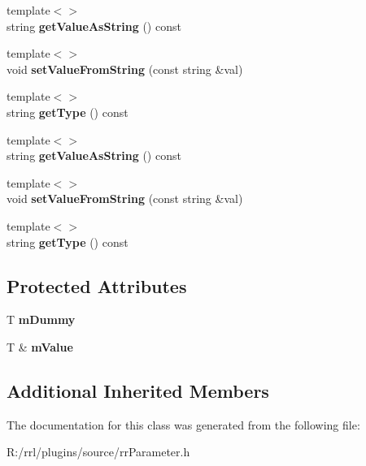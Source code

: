 \begin{DoxyCompactItemize}
\item 
\hypertarget{classrrp_1_1_parameter_a2f3b3ce7dbe0f955aa7c177637f9fbb0}{{\footnotesize template$<$$>$ }\\string {\bfseries get\-Value\-As\-String} () const}\label{classrrp_1_1_parameter_a2f3b3ce7dbe0f955aa7c177637f9fbb0}

\item 
\hypertarget{classrrp_1_1_parameter_a1621a0f9b6cd7c6973f1a660622becf7}{{\footnotesize template$<$$>$ }\\void {\bfseries set\-Value\-From\-String} (const string \&val)}\label{classrrp_1_1_parameter_a1621a0f9b6cd7c6973f1a660622becf7}

\item 
\hypertarget{classrrp_1_1_parameter_a49aebd913ae26cd0a3c2cce3c758171e}{{\footnotesize template$<$$>$ }\\string {\bfseries get\-Type} () const}\label{classrrp_1_1_parameter_a49aebd913ae26cd0a3c2cce3c758171e}

\item 
\hypertarget{classrrp_1_1_parameter_a2f3b3ce7dbe0f955aa7c177637f9fbb0}{{\footnotesize template$<$$>$ }\\string {\bfseries get\-Value\-As\-String} () const}\label{classrrp_1_1_parameter_a2f3b3ce7dbe0f955aa7c177637f9fbb0}

\item 
\hypertarget{classrrp_1_1_parameter_a1621a0f9b6cd7c6973f1a660622becf7}{{\footnotesize template$<$$>$ }\\void {\bfseries set\-Value\-From\-String} (const string \&val)}\label{classrrp_1_1_parameter_a1621a0f9b6cd7c6973f1a660622becf7}

\item 
\hypertarget{classrrp_1_1_parameter_a49aebd913ae26cd0a3c2cce3c758171e}{{\footnotesize template$<$$>$ }\\string {\bfseries get\-Type} () const}\label{classrrp_1_1_parameter_a49aebd913ae26cd0a3c2cce3c758171e}

\end{DoxyCompactItemize}
\subsection*{Protected Attributes}
\begin{DoxyCompactItemize}
\item 
\hypertarget{classrrp_1_1_parameter_a352ea85089b53c64f5f696fc75637e76}{T {\bfseries m\-Dummy}}\label{classrrp_1_1_parameter_a352ea85089b53c64f5f696fc75637e76}

\item 
\hypertarget{classrrp_1_1_parameter_a17c758418ae0715b3ab78412ce858bdb}{T \& {\bfseries m\-Value}}\label{classrrp_1_1_parameter_a17c758418ae0715b3ab78412ce858bdb}

\end{DoxyCompactItemize}
\subsection*{Additional Inherited Members}


The documentation for this class was generated from the following file\-:\begin{DoxyCompactItemize}
\item 
R\-:/rrl/plugins/source/rr\-Parameter.\-h\end{DoxyCompactItemize}

